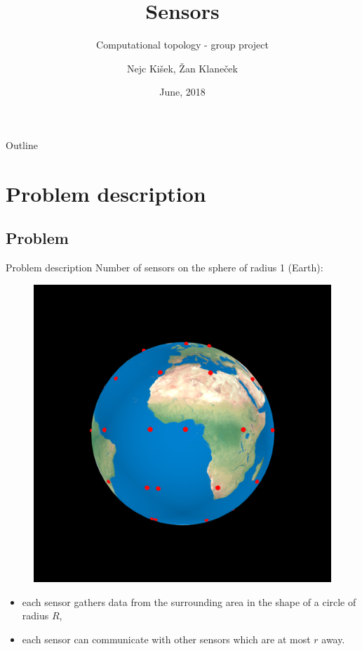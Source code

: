 \documentclass{beamer}
\title{Sensors}
\subtitle{Computational topology - group project}
\author[]{Nejc Kišek, Žan Klaneček}
\institute[] %
{

  Faculty of computer and information science\\
  University of Ljubljana}
\date{June, 2018}
\begin{document}
\begin{frame}
  \titlepage
\end{frame}

\begin{frame}{Outline}
  \tableofcontents
\end{frame}

\section{Problem description}
\subsection{Problem}

\begin{frame}{Problem description}{}
Number of sensors on the sphere of radius 1 (Earth):
\begin{figure}[!ht]
	
	\includegraphics[scale=0.1]{used_images/sensors01}
\end{figure}
\begin{itemize}
	\item {
		each sensor gathers data from the surrounding area in the shape of a circle of radius
		$R$,
	}
	\item {
		each sensor can communicate with other sensors which are at most $r$ away.
	}
\end{itemize}


\end{frame}
\end{document}

